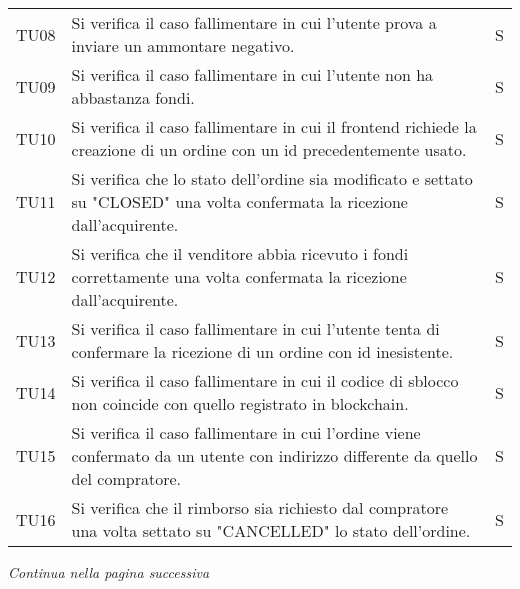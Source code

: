 \begin{table}[H]
\begin{tabular}{c|p{10cm}|c}
    TU08 & Si verifica il caso fallimentare in cui l'utente prova a inviare un ammontare negativo.                                           & S \\
    TU09 & Si verifica il caso fallimentare in cui l'utente non ha abbastanza fondi.                                                         & S \\
    TU10 & Si verifica il caso fallimentare in cui il frontend\glo{} richiede la creazione di un ordine con un id precedentemente usato.           & S \\
    TU11 & Si verifica che lo stato dell'ordine sia modificato e settato su "CLOSED" una volta confermata la ricezione dall'acquirente.      & S \\
    TU12 & Si verifica che il venditore abbia ricevuto i fondi correttamente una volta confermata la ricezione dall'acquirente.              & S \\
    TU13 & Si verifica il caso fallimentare in cui l'utente tenta di confermare la ricezione di un ordine con id inesistente.                & S \\
    TU14 & Si verifica il caso fallimentare in cui il codice di sblocco non coincide con quello registrato in blockchain\glo{}.                    & S \\
    TU15 & Si verifica il caso fallimentare in cui l'ordine viene confermato da un utente con indirizzo differente da quello del compratore. & S \\
    TU16 & Si verifica che il rimborso sia richiesto dal compratore una volta settato su "CANCELLED" lo stato dell'ordine.                   & S \\
  \end{tabular}
\end{table}
\begin{center}
  \textit{\small Continua nella pagina successiva}
\end{center}
